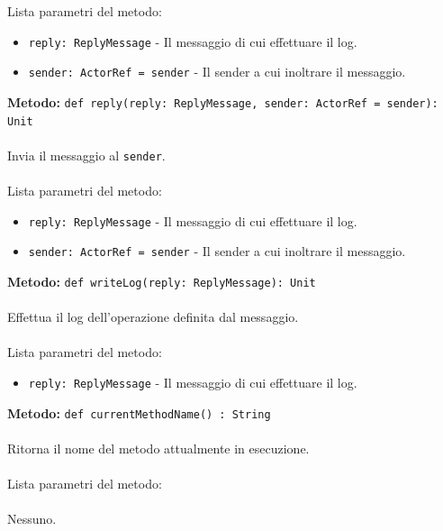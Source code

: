 \documentclass[a4paper]{article}
\begin{document}
			Lista parametri del metodo:
			\begin{itemize}
				\item \texttt{reply: ReplyMessage} - Il messaggio di cui effettuare il log.
				\item \texttt{sender: ActorRef = sender} - Il sender a cui inoltrare il messaggio.
			\end{itemize}	
		\textbf{Metodo: }\texttt{def reply(reply: ReplyMessage, sender: ActorRef = sender): Unit}
			\\ \\
			Invia il messaggio al \texttt{sender}.
			\\ \\
			Lista parametri del metodo:
			\begin{itemize}
				\item \texttt{reply: ReplyMessage} - Il messaggio di cui effettuare il log.
				\item \texttt{sender: ActorRef = sender} - Il sender a cui inoltrare il messaggio.
			\end{itemize}	
		\textbf{Metodo: }\texttt{def writeLog(reply: ReplyMessage): Unit}
			\\ \\
			Effettua il log dell'operazione definita dal messaggio.
			\\ \\
			Lista parametri del metodo:
			\begin{itemize}
				\item \texttt{reply: ReplyMessage} - Il messaggio di cui effettuare il log.
			\end{itemize}	
		\textbf{Metodo: }\texttt{def currentMethodName() : String}
			\\ \\
			Ritorna il nome del metodo attualmente in esecuzione.
			\\ \\
			Lista parametri del metodo:
			\\ \\
			Nessuno.
			
\end{document}
